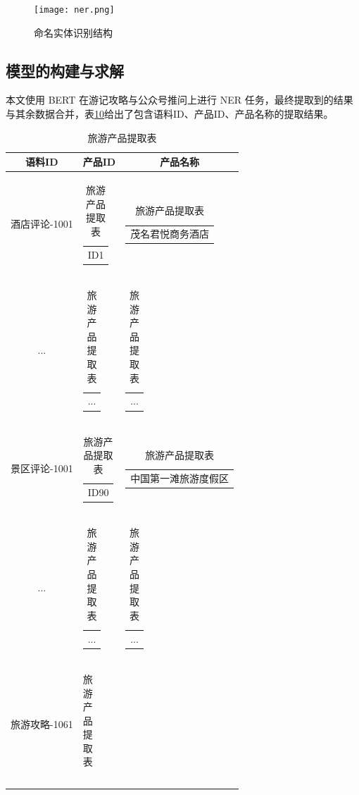 \documentclass[bwprint]{gmcmthesis}
\begin{document}
\begin{figure}[!h]
  \centering
  \texttt{[image: ner.png]}
  \caption{命名实体识别结构}
  \label{ner}
  \end{figure}


\subsection{模型的构建与求解}

本文使用 BERT 在游记攻略与公众号推问上进行 NER 任务，最终提取到的结果与其余数据合并，表\ref{entity_related}给出了包含语料ID、产品ID、产品名称的提取结果。
\newpage

\begin{center}
  \begin{longtable}{c|c|c}
    \caption{旅游产品提取表}
    \label{entity_related}\\
      \hline
      \textbf{语料ID} & \textbf{产品ID} & \textbf{产品名称} \\
      \hline
      酒店评论-1001 & \begin{tabular}[c]{@{}c@{}}
        ID1
        \end{tabular} 
        & \begin{tabular}[c]{@{}l@{}}
          茂名君悦商务酒店
        \end{tabular} \\
        ... & \begin{tabular}[c]{@{}c@{}}
          ...
        \end{tabular} 
        & \begin{tabular}[c]{@{}l@{}}
          ...
        \end{tabular} \\
        景区评论-1001 & \begin{tabular}[c]{@{}c@{}}
          ID90
          \end{tabular} 
          & \begin{tabular}[c]{@{}l@{}}
            中国第一滩旅游度假区
          \end{tabular} \\
          ... & \begin{tabular}[c]{@{}c@{}}
            ...
          \end{tabular} 
          & \begin{tabular}[c]{@{}l@{}}
            ...
          \end{tabular} \\
          旅游攻略-1061 & \begin{tabular}[c]{@{}c@{}}

\end{tabular}
\end{longtable}
\end{center}
\end{document}
